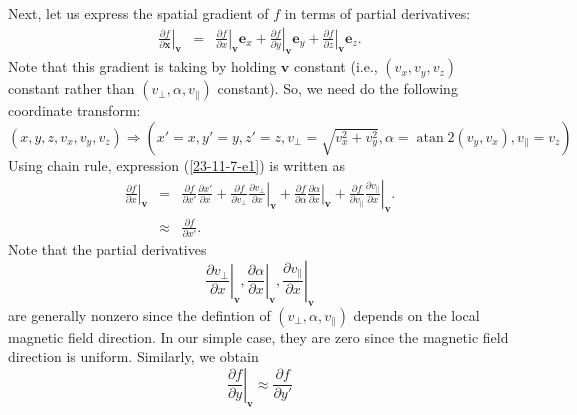 \documentclass{article}
\newcommand{\tmop}[1]{\ensuremath{\operatorname{#1}}}
\begin{document}
Next, let us express the spatial gradient of $f$ in terms of partial
derivatives:
\begin{eqnarray}
  \left. \frac{\partial f}{\partial \mathbf{x}} \right|_{\mathbf{v}} & = &
  \left. \frac{\partial f}{\partial x} \right|_{\mathbf{v}} \mathbf{e}_x +
  \left. \frac{\partial f}{\partial y} \right|_{\mathbf{v}} \mathbf{e}_y +
  \left. \frac{\partial f}{\partial z} \right|_{\mathbf{v}} \mathbf{e}_z . 
  \label{23-11-7-e1}
\end{eqnarray}
Note that this gradient is taking by holding $\mathbf{v}$ constant (i.e.,
$(v_x, v_y, v_z)$ constant rather than $(v_{\perp}, \alpha, v_{\parallel})$
constant). So, we need do the following coordinate transform:
\begin{equation}
  (x, y, z, v_x, v_y, v_z) \Rightarrow \left( x' = x, y' = y, z' = z,
  v_{\perp} = \sqrt{v_x^2 + v_y^2}, \alpha = \tmop{atan} 2 (v_y, v_x),
  v_{\parallel} = v_z \right)
\end{equation}
Using chain rule, expression (\ref{23-11-7-e1}) is written as
\begin{eqnarray}
  \left. \frac{\partial f}{\partial x} \right|_{\mathbf{v}} & = &
  \frac{\partial f}{\partial x'} \frac{\partial x'}{\partial x} +
  \frac{\partial f}{\partial v_{\perp}}  \left. \frac{\partial
  v_{\perp}}{\partial x} \right|_{\mathbf{v}} + \frac{\partial f}{\partial
  \alpha}  \left. \frac{\partial \alpha}{\partial x}  \right|_{\mathbf{v}} +
  \frac{\partial f}{\partial v_{\parallel}}  \left. \frac{\partial
  v_{\parallel}}{\partial x} \right|_{\mathbf{v}} . \\
  & \approx & \frac{\partial f}{\partial x'} . 
\end{eqnarray}
Note that the partial derivatives
\begin{equation}
  \left. \frac{\partial v_{\perp}}{\partial x} \right|_{\mathbf{v}} \left.,
  \frac{\partial \alpha}{\partial x} \right|_{\mathbf{v}}, \left.
  \frac{\partial v_{\parallel}}{\partial x} \right|_{\mathbf{v}}
\end{equation}
are generally nonzero since the defintion of $(v_{\perp}, \alpha,
v_{\parallel})$ depends on the local magnetic field direction. In our simple
case, they are zero since the magnetic field direction is uniform. Similarly,
we obtain
\begin{equation}
  \left. \frac{\partial f}{\partial y} \right|_{\mathbf{v}} \approx
  \frac{\partial f}{\partial y'}
\end{equation}
\end{document}
